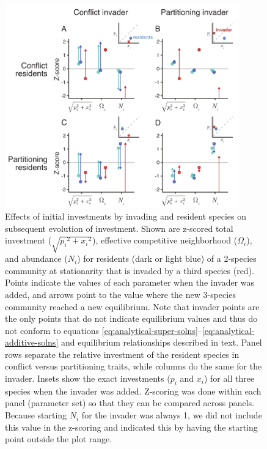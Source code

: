 \documentclass[11pt]{article}
\begin{document}
\clearpage

\begin{figure}[ht!]
\centering
\includegraphics[width=0.9\textwidth,keepaspectratio]{4-one-invader}
\caption{Effects of initial investments by invading and
resident species on subsequent evolution of investment. Shown are
z-scored total investment ($\sqrt{{p_{i}}^{2} + {x_{i}}^{2}}$), effective
competitive neighborhood ($\Omega_{i}$), and abundance ($N_{i}$) for
residents (dark or light blue) of a 2-species community at stationarity
that is invaded by a third species (red). Points indicate the values of
each parameter when the invader was added, and arrows point to the value
where the new 3-species community reached a new equilibrium. Note that
invader points are the only points that do not indicate equilibrium
values and thus do not conform to equations
\ref{eq:analytical-super-solns}--\ref{eq:analytical-additive-solns} and
equilibrium relationships described in text. Panel rows separate the relative
investment of the resident species in conflict versus partitioning
traits, while columns do the same for the invader. Insets show the exact
investments ($p_{i}$ and $x_{i}$) for all three species when the
invader was added. Z-scoring was done within each panel (parameter set)
so that they can be compared across panels. Because starting $N_{i}$
for the invader was always 1, we did not include this value in the
z-scoring and indicated this by having the starting point outside the
plot range.}
\label{fig:one-invader}
\end{figure}

\clearpage
\end{document}
